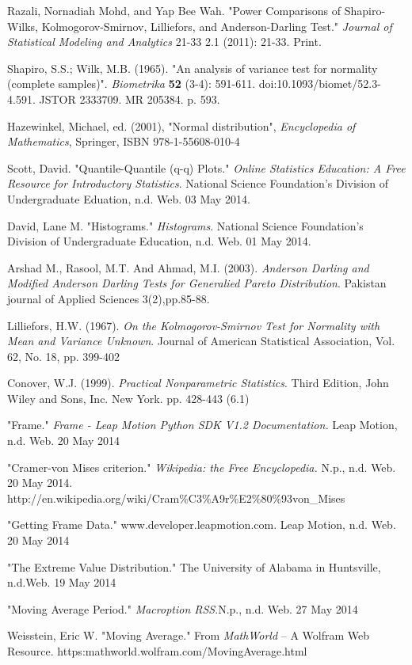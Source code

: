 \documentclass[letterpaper,english, 12pt]{article}
\begin{document}
\begin{thebibliography}{1}

	 Razali, Nornadiah Mohd, and Yap Bee Wah. "Power Comparisons of Shapiro-Wilks, Kolmogorov-Smirnov, Lilliefors, and Anderson-Darling Test." {\em Journal of Statistical Modeling and Analytics} 21-33 2.1 (2011): 21-33. Print.
		
	 Shapiro, S.S.; Wilk, M.B. (1965). "An analysis of variance test for normality (complete samples)". {\em Biometrika} \textbf{52} (3-4):  591-611. doi:10.1093/biomet/52.3-4.591. JSTOR 2333709. MR 205384. p. 593.

	 Hazewinkel, Michael, ed. (2001), "Normal distribution", {\em Encyclopedia of Mathematics}, Springer, ISBN 978-1-55608-010-4

	 Scott, David. "Quantile-Quantile (q-q) Plots." {\em Online Statistics Education: A Free Resource for Introductory Statistics}. National Science Foundation's Division of Undergraduate Eduation, n.d. Web. 03 May 2014.

	 David, Lane M. "Histograms." {\em Histograms}. National Science Foundation's Division of Undergraduate Education, n.d. Web. 01 May 2014.

	 Arshad M., Rasool, M.T. And Ahmad, M.I. (2003). {\em Anderson Darling and Modified Anderson Darling Tests for Generalied Pareto Distribution}. Pakistan journal of Applied Sciences 3(2),pp.85-88.

	 Lilliefors, H.W. (1967). {\em On the Kolmogorov-Smirnov Test for Normality with Mean and Variance Unknown}. Journal of American Statistical Association, Vol. 62, No. 18, pp. 399-402

	 Conover, W.J. (1999). {\em Practical Nonparametric Statistics}. Third Edition, John Wiley and Sons, Inc. New York. pp. 428-443 (6.1)
	
	 "Frame." {\em Frame - Leap Motion Python SDK V1.2 Documentation.} Leap Motion, n.d. Web. 20 May 2014
		
	 "Cramer-von Mises criterion." {\em Wikipedia: the Free Encyclopedia.} N.p., n.d. Web. 20 May 2014. http://en.wikipedia.org/wiki/Cram\%C3\%A9r\%E2\%80\%93von\_Mises

	 "Getting Frame Data." www.developer.leapmotion.com. Leap Motion, n.d. Web. 20 May 2014

	 "The Extreme Value Distribution." The University of Alabama in Huntsville, n.d.Web. 19 May 2014

	 "Moving Average Period." {\em Macroption RSS}.N.p., n.d. Web. 27 May 2014
	
	 Weisstein, Eric W. "Moving Average." From {\em MathWorld} -- A Wolfram Web Resource. https:mathworld.wolfram.com/MovingAverage.html
\end{thebibliography}
\end{document}
